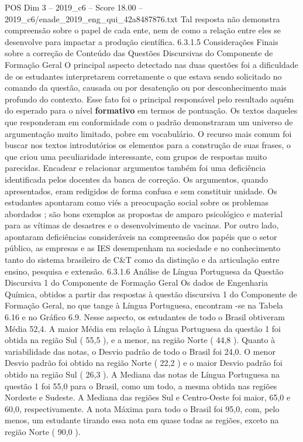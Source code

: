 \begin{textsample}{POS Dim 3 – 2019\_c6 – Score 18.00 – 2019\_c6/enade\_2019\_eng\_qui\_42a8487876.txt}
Tal resposta não demonstra compreensão sobre o papel de cada ente, nem de como a relação entre eles se desenvolve para impactar a produção científica. 6.3.1.5 Considerações Finais sobre a correção de Conteúdo das Questões Discursivas do Componente de Formação Geral O principal aspecto detectado nas duas questões foi a dificuldade de os estudantes interpretarem corretamente o que estava sendo solicitado no comando da questão, causada ou por desatenção ou por desconhecimento mais profundo do contexto.
Esse fato foi o principal responsável pelo resultado aquém do esperado para o nível \textbf{formativo} em termos de pontuação.
Os textos daqueles que responderam em conformidade com o padrão demonstraram um universo de argumentação muito limitado, pobre em vocabulário.
O recurso mais comum foi buscar nos textos introdutórios os elementos para a construção de suas frases, o que criou uma peculiaridade interessante, com grupos de respostas muito parecidas.
Encadear e relacionar argumentos também foi uma deficiência identificada pelos docentes da banca de correção.
Os argumentos, quando apresentados, eram redigidos de forma confusa e sem constituir unidade.
Os estudantes apontaram como viés a preocupação social sobre os problemas abordados ; são bons exemplos as propostas de amparo psicológico e material para as vítimas de desastres e o desenvolvimento de vacinas.
Por outro lado, apontaram deficiências consideráveis na compreensão dos papéis que o setor público, as empresas e as IES desempenham na sociedade e no conhecimento tanto do sistema brasileiro de C\&T como da distinção e da articulação entre ensino, pesquisa e extensão. 6.3.1.6 Análise de Língua Portuguesa da Questão Discursiva 1 do Componente de Formação Geral Os dados de Engenharia Química, obtidos a partir das respostas à questão discursiva 1 do Componente de Formação Geral, no que tange à Língua Portuguesa, encontram -se na Tabela 6.16 e no Gráfico 6.9.
Nesse aspecto, os estudantes de todo o Brasil obtiveram Média 52,4.
A maior Média em relação à Língua Portuguesa da questão 1 foi obtida na região Sul ( 55,5 ), e a menor, na região Norte ( 44,8 ).
Quanto à variabilidade das notas, o Desvio padrão de todo o Brasil foi 24,0.
O menor Desvio padrão foi obtido na região Norte ( 22,2 ) e o maior Desvio padrão foi obtido na região Sul ( 26,3 ).
A Mediana das notas de Língua Portuguesa na questão 1 foi 55,0 para o Brasil, como um todo, a mesma obtida nas regiões Nordeste e Sudeste.
A Mediana das regiões Sul e Centro-Oeste foi maior, 65,0 e 60,0, respectivamente.
A nota Máxima para todo o Brasil foi 95,0, com, pelo menos, um estudante tirando essa nota em quase todas as regiões, exceto na região Norte ( 90,0 ).

\end{textsample}

